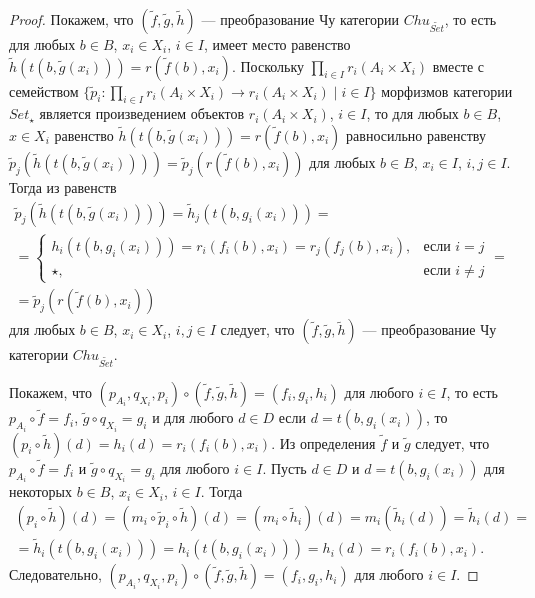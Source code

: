 \documentclass[a4paper,12pt]{article}
\begin{document}
\begin{proof}
    Покажем, что $(\tilde{f},\tilde{g},\tilde{h})$ --- преобразование Чу категории $Chu_{\widetilde{Set}}$, то есть для любых $b \in B$, $x_i \in X_i$, $i \in I$, имеет место равенство $\tilde{h}(t(b,\tilde{g}(x_i))) = r(\tilde{f}(b),x_i)$. Поскольку $\prod_{i \in I} r_i(A_i \times X_i)$ вместе с семейством $\{\tilde{p}_i: \prod_{i \in I} r_i(A_i \times X_i) \to r_i(A_i \times X_i) \mid i \in I\}$ морфизмов категории $Set_\star$ является произведением объектов $r_i(A_i \times X_i)$, $i \in I$, то для любых $b \in B$, $x \in X_i$ равенство $\tilde{h}(t(b,\tilde{g}(x_i))) = r(\tilde{f}(b),x_i)$ равносильно равенству $\tilde{p}_j(\tilde{h}(t(b,\tilde{g}(x_i)))) = \tilde{p}_j(r(\tilde{f}(b),x_i))$ для любых $b \in B$, $x_i \in I$, $i,j \in I$. Тогда из равенств
    \begin{multline*}
        \tilde{p}_j(\tilde{h}(t(b,\tilde{g}(x_i)))) = \tilde{h}_j(t(b,g_i(x_i))) =\\= 
        \begin{cases}
            h_i(t(b,g_i(x_i))) = r_i(f_i(b),x_i) = r_j(f_j(b),x_i),& \text{если } i = j\\
            \star,& \text{если } i \ne j
        \end{cases} =\\=
        \tilde{p}_j(r(\tilde{f}(b),x_i))
    \end{multline*}
    для любых $b \in B$, $x_i \in X_i$, $i,j \in I$ следует, что $(\tilde{f},\tilde{g},\tilde{h})$ --- преобразование Чу категории $Chu_{\widetilde{Set}}$.

    Покажем, что $(p_{A_i},q_{X_i},p_i) \circ (\tilde{f},\tilde{g},\tilde{h}) = (f_i,g_i,h_i)$ для любого $i \in I$, то есть $p_{A_i} \circ \tilde{f} = f_i$, $\tilde{g} \circ q_{X_i} = g_i$ и для любого $d \in D$ если $d = t(b,g_i(x_i))$, то $(p_i \circ \tilde{h})(d) = h_i(d) = r_i(f_i(b),x_i)$. Из определения $\tilde{f}$ и $\tilde{g}$ следует, что $p_{A_i} \circ \tilde{f} = f_i$ и $\tilde{g} \circ q_{X_i} = g_i$ для любого $i \in I$. Пусть $d \in D$ и $d = t(b,g_i(x_i))$ для некоторых $b \in B$, $x_i \in X_i$, $i \in I$. Тогда
    \begin{multline*}
        (p_i \circ \tilde{h})(d) = (m_i \circ \tilde{p}_i \circ \tilde{h})(d) = (m_i \circ \tilde{h}_i)(d) = m_i(\tilde{h}_i(d)) = \tilde{h}_i(d) =\\=
        \tilde{h}_i(t(b,g_i(x_i))) = h_i(t(b,g_i(x_i))) = h_i(d) = r_i(f_i(b),x_i).
    \end{multline*}
    Следовательно, $(p_{A_i},q_{X_i},p_i) \circ (\tilde{f},
    \tilde{g},\tilde{h}) = (f_i,g_i,h_i)$ для любого $i \in I$.


\end{proof}
\end{document}
